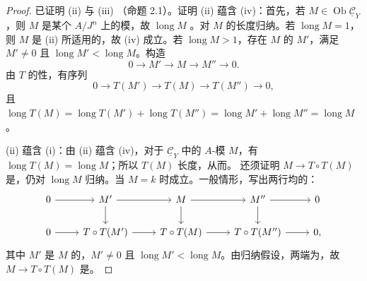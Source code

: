 \begin{proof}
已证明 (ii) 与 (iii) （命题 2.1）。证明 (ii) 蕴含 (iv)：首先，若 $M\in\operatorname{Ob}\underline{\mathcal C}_Y$，则 $M$ 是某个  $A/J^n$ 上的模，故 $\operatorname{long}M$ 。对 $M$ 的长度归纳。若 $\operatorname{long}M=1$，则 $M$ 是 (ii) 所适用的，故 (iv) 成立。若 $\operatorname{long}M>1$，存在 $M$ 的 $M'$，满足 $M'\ne0$ 且 $\operatorname{long}M'<\operatorname{long}M$。构造
\[0\longrightarrow M'\longrightarrow M\longrightarrow M''\longrightarrow0.\]
由 $T$ 的性，有序列
\[0\longrightarrow T(M')\longrightarrow T(M)\longrightarrow T(M'')\longrightarrow0,\]
且 $\operatorname{long}T(M)=\operatorname{long}T(M')+\operatorname{long}T(M'')=\operatorname{long}M'+\operatorname{long}M''=\operatorname{long}M$。

(ii) 蕴含 (i)：由 (ii) 蕴含 (iv)，对于 $\underline{\mathcal C}_Y$ 中的 $A$-模 $M$，有 $\operatorname{long}T(M)=\operatorname{long}M$；所以 $T(M)$ 长度，从而。
还须证明 $M\to T\circ T(M)$ 是，仍对 $\operatorname{long}M$ 归纳。当 $M=k$ 时成立。一般情形，写出两行均的：
\[\begin{tikzcd}
0\arrow[r]&M'\arrow[r]\arrow[d]&M\arrow[r]\arrow[d]&M''\arrow[r]\arrow[d]&0\\
0\arrow[r]&T\circ T(M')\arrow[r]&T\circ T(M)\arrow[r]&T\circ T(M'')\arrow[r]&0,
\end{tikzcd}\]
其中 $M'$ 是 $M$ 的，$M'\ne0$ 且 $\operatorname{long}M'<\operatorname{long}M$。由归纳假设，两端为，故 $M\to T\circ T(M)$ 是。


\end{proof}
